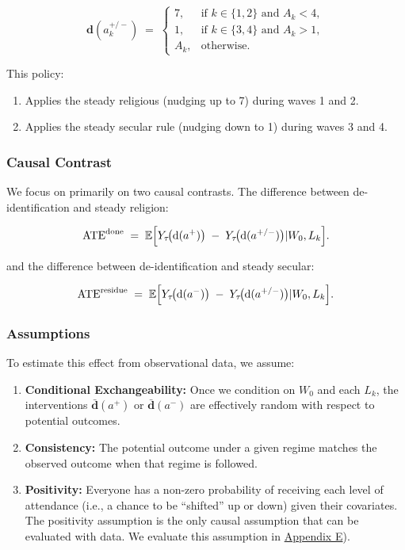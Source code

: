 \documentclass[
  single column]{article}
\providecommand{\tightlist}{%
  \setlength{\itemsep}{0pt}\setlength{\parskip}{0pt}}
\begin{document}
\[
\boldsymbol{\text{d}}(a_k^{+/-})  \;=\; \begin{cases} 
7, & \text{if } k \in \{1, 2\} \text{ and } A_k < 4,\\[6pt] 
1, & \text{if } k \in \{3, 4\} \text{ and } A_k > 1,\\[6pt] 
A_k, & \text{otherwise.} 
\end{cases}
\]

This policy:

\begin{enumerate}
\def\labelenumi{\arabic{enumi}.}
\tightlist
\item
  Applies the steady religious (nudging up to 7) during waves 1 and 2.
\item
  Applies the steady secular rule (nudging down to 1) during waves 3 and
  4.
\end{enumerate}

\subsubsection{Causal Contrast}\label{causal-contrast}

We focus on primarily on two causal contrasts. The difference between
de-identification and steady religion:

\[
\text{ATE}^{\text{done}} 
\;=\; 
\mathbb{E}
\Bigl[
  Y_\tau\!\bigl(\boldsymbol{\text{d}}(a^+)\bigr) 
  \;-\; 
  Y_\tau\!\bigl(\boldsymbol{\text{d}}(a^{+/-})\bigr)|W_0, L_k
\Bigr].
\]

and the difference between de-identification and steady secular:

\[
\text{ATE}^{\text{residue}} 
\;=\; 
\mathbb{E}
\Bigl[
  Y_\tau\!\bigl(\boldsymbol{\text{d}}(a^-)\bigr) 
  \;-\; 
  Y_\tau\!\bigl(\boldsymbol{\text{d}}(a^{+/-})\bigr)|W_0, L_k
\Bigr].
\]

\subsubsection{Assumptions}\label{assumptions}

To estimate this effect from observational data, we assume:

\begin{enumerate}
\def\labelenumi{\arabic{enumi}.}
\tightlist
\item
  \textbf{Conditional Exchangeability:} Once we condition on \(W_0\) and
  each \(L_k\), the interventions
  \(\boldsymbol{\bar{\boldsymbol{\text{d}}}}(a^+)\) or
  \(\boldsymbol{\bar{\boldsymbol{\text{d}}}}(a^-)\) are effectively
  random with respect to potential outcomes.
\item
  \textbf{Consistency:} The potential outcome under a given regime
  matches the observed outcome when that regime is followed.
\item
  \textbf{Positivity:} Everyone has a non-zero probability of receiving
  each level of attendance (i.e., a chance to be ``shifted'' up or down)
  given their covariates. The positivity assumption is the only causal
  assumption that can be evaluated with data. We evaluate this
  assumption in \hyperref[appendix-transition]{Appendix E}).
\end{enumerate}
\end{document}
